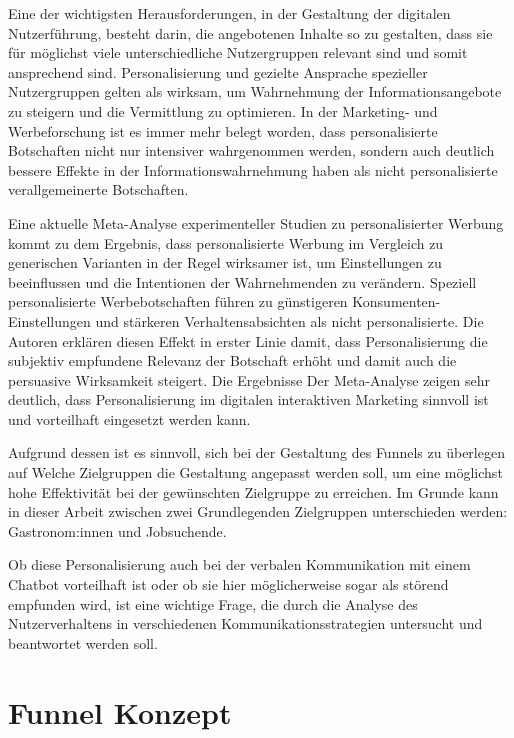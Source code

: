 Eine der wichtigsten Herausforderungen, in der Gestaltung der digitalen Nutzerführung, besteht
darin, die angebotenen Inhalte so zu gestalten, dass sie für möglichst viele
unterschiedliche Nutzergruppen relevant sind und somit ansprechend sind.
Personalisierung und gezielte Ansprache spezieller Nutzergruppen gelten als wirksam,
um Wahrnehmung der Informationsangebote zu steigern und die Vermittlung zu optimieren. In
der Marketing- und Werbeforschung ist es immer mehr belegt worden, dass personalisierte
Botschaften nicht nur intensiver wahrgenommen werden, sondern auch deutlich bessere
Effekte in der Informationswahrnehmung haben als nicht personalisierte verallgemeinerte Botschaften.

Eine aktuelle Meta-Analyse experimenteller Studien zu personalisierter Werbung kommt
zu dem Ergebnis, dass personalisierte Werbung im Vergleich zu generischen Varianten in der
Regel wirksamer ist, um Einstellungen zu beeinflussen und die Intentionen der Wahrnehmenden
zu verändern.
Speziell personalisierte Werbebotschaften führen zu günstigeren
Konsumenten-Einstellungen und stärkeren Verhaltensabsichten als nicht personalisierte.
Die Autoren erklären diesen Effekt in erster Linie damit, dass Personalisierung die
subjektiv empfundene Relevanz der Botschaft erhöht und damit auch die persuasive
Wirksamkeit steigert.
Die Ergebnisse Der Meta-Analyse zeigen sehr deutlich, dass Personalisierung im digitalen
interaktiven Marketing sinnvoll ist und vorteilhaft eingesetzt werden kann.
\cite{Yeo2025metaPersonalizedAdvertising}

Aufgrund dessen ist es sinnvoll, sich bei der Gestaltung des Funnels zu überlegen auf Welche
Zielgruppen die Gestaltung angepasst werden soll, um eine möglichst hohe Effektivität bei
der gewünschten Zielgruppe zu erreichen. Im Grunde kann in dieser Arbeit zwischen zwei 
Grundlegenden Zielgruppen unterschieden werden: Gastronom:innen und Jobsuchende.

Ob diese Personalisierung auch bei der verbalen Kommunikation mit einem Chatbot vorteilhaft
ist oder ob sie hier möglicherweise sogar als störend empfunden wird, ist eine wichtige
Frage, die durch die Analyse des Nutzerverhaltens in verschiedenen Kommunikationsstrategien
untersucht und beantwortet werden soll.

\setauthor{\firstauthor}
\section{Funnel Konzept}

